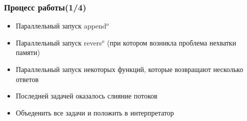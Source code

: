 \documentclass[aspectratio=169]{beamer}
\newtheorem{rutheorem}{Теорема}
\begin{document}




\begin{frame}
	\frametitle{Процесс работы(1/4)}
	\begin{itemize}
		\item Параллельный запуск append$^{o}$
		\item Параллельный запуск revers$^{o}$ (при котором возникла проблема нехватки памяти)
		\item Параллельный запуск некоторых функций, которые возвращают несколько ответов
		\item Последней задачей оказалось слияние потоков
		\item Объеденить все задачи и положить в интерпретатор
	\end{itemize}
\end{frame}
\end{document}
